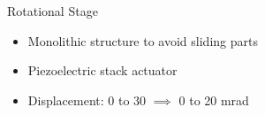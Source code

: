 \documentclass[10pt]{beamer}
\begin{document}
\begin{frame}{Rotational Stage}
  \begin{itemize}
    \item Monolithic structure to avoid sliding parts
    \item Piezoelectric stack actuator
    \item Displacement: 0 to \unit{30}{\micro\meter} $\implies$ 0 to 20 mrad
  \end{itemize}

  \begin{figure}[h!]
    \centering %
    \qquad
  \end{figure}
\end{frame}

\end{document}
